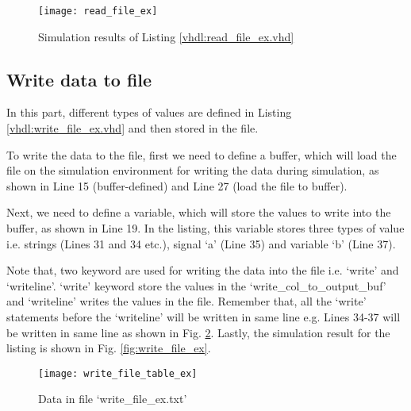 

\begin{figure}[!h]
	\centering
	\texttt{[image: read\_file\_ex]}
	\caption{Simulation results of Listing \ref{vhdl:read_file_ex.vhd} }
	\label{fig:read_file_ex}
\end{figure}


\subsection{Write data to file}

In this part, different types of values are defined in Listing \ref{vhdl:write_file_ex.vhd} and then stored in the file. 

\begin{explanation}
	To write the data to the file, first we need to define a buffer, which will load the file on the simulation environment for writing the data during simulation,  as shown in Line 15 (buffer-defined) and Line 27 (load the file to buffer). 
	
	Next, we need to define a variable, which will store the values to write into the buffer, as shown in Line 19. In the listing, this variable stores three types of value i.e. strings (Lines 31 and 34 etc.), signal `a' (Line 35) and variable `b' (Line 37). 
	
	Note that, two keyword are used for writing the data into the file i.e. `write' and `writeline'. `write' keyword store the values in the `write\_col\_to\_output\_buf' and `writeline' writes the values in the file. Remember that, all the `write' statements before the `writeline' will be written in same line e.g. Lines 34-37 will be written in same line as shown in Fig. \ref{fig:write_file_table_ex}. Lastly, the simulation result for the listing is shown in Fig. \ref{fig:write_file_ex}. 
\end{explanation}





\begin{figure}[!h]
	\centering
	\texttt{[image: write\_file\_table\_ex]}
	\caption{Data in file  `write\_file\_ex.txt'}
	\label{fig:write_file_table_ex}
\end{figure}

